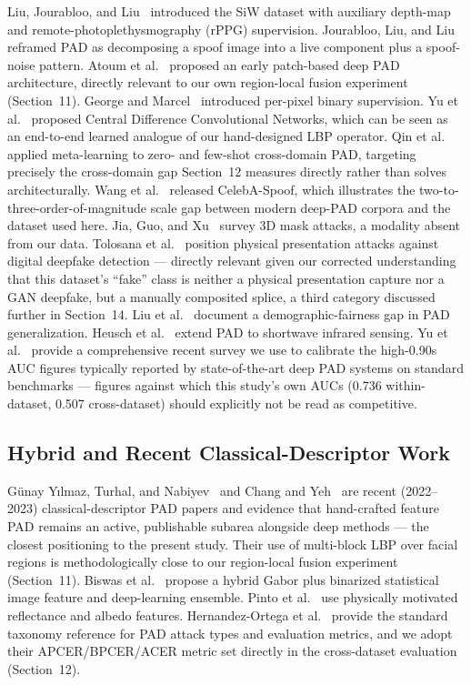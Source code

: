 \documentclass[11pt]{article}
\begin{document}
Liu, Jourabloo, and Liu~\cite{liu2018} introduced the SiW dataset with auxiliary depth-map and remote-photoplethysmography (rPPG) supervision. Jourabloo, Liu, and Liu~\cite{jourabloo2018} reframed PAD as decomposing a spoof image into a live component plus a spoof-noise pattern. Atoum et al.~\cite{atoum2017} proposed an early patch-based deep PAD architecture, directly relevant to our own region-local fusion experiment (Section~11). George and Marcel~\cite{george2019} introduced per-pixel binary supervision. Yu et al.~\cite{yu2020} proposed Central Difference Convolutional Networks, which can be seen as an end-to-end learned analogue of our hand-designed LBP operator. Qin et al.~\cite{qin2020} applied meta-learning to zero- and few-shot cross-domain PAD, targeting precisely the cross-domain gap Section~12 measures directly rather than solves architecturally. Wang et al.~\cite{wang2020} released CelebA-Spoof, which illustrates the two-to-three-order-of-magnitude scale gap between modern deep-PAD corpora and the dataset used here. Jia, Guo, and Xu~\cite{jia2020} survey 3D mask attacks, a modality absent from our data. Tolosana et al.~\cite{tolosana2020} position physical presentation attacks against digital deepfake detection --- directly relevant given our corrected understanding that this dataset's ``fake'' class is neither a physical presentation capture nor a GAN deepfake, but a manually composited splice, a third category discussed further in Section~14. Liu et al.~\cite{liu2021} document a demographic-fairness gap in PAD generalization. Heusch et al.~\cite{heusch2020} extend PAD to shortwave infrared sensing. Yu et al.~\cite{yu2023} provide a comprehensive recent survey we use to calibrate the high-0.90s AUC figures typically reported by state-of-the-art deep PAD systems on standard benchmarks --- figures against which this study's own AUCs (0.736 within-dataset, 0.507 cross-dataset) should explicitly not be read as competitive.

\subsection{Hybrid and Recent Classical-Descriptor Work}

G\"unay Y\i lmaz, Turhal, and Nabiyev~\cite{gunay2023} and Chang and Yeh~\cite{chang2022} are recent (2022--2023) classical-descriptor PAD papers and evidence that hand-crafted feature PAD remains an active, publishable subarea alongside deep methods --- the closest positioning to the present study. Their use of multi-block LBP over facial regions is methodologically close to our region-local fusion experiment (Section~11). Biswas et al.~\cite{biswas2025} propose a hybrid Gabor plus binarized statistical image feature and deep-learning ensemble. Pinto et al.~\cite{pinto2020} use physically motivated reflectance and albedo features. Hernandez-Ortega et al.~\cite{hernandez2019} provide the standard taxonomy reference for PAD attack types and evaluation metrics, and we adopt their APCER/BPCER/ACER metric set directly in the cross-dataset evaluation (Section~12).
\end{document}
